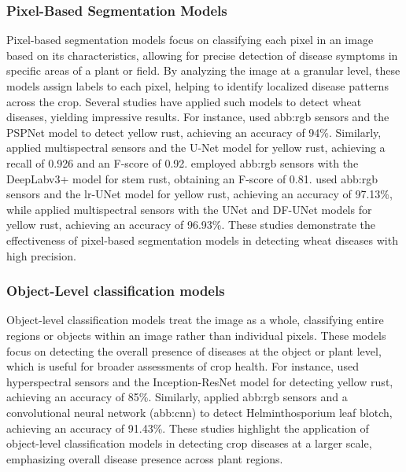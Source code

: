 \subsubsection{Pixel-Based Segmentation Models}

Pixel-based segmentation models focus on classifying each pixel in an image based on its characteristics, allowing for precise detection of disease symptoms in specific areas of a plant or field. By analyzing the image at a granular level, these models assign labels to each pixel, helping to identify localized disease patterns across the crop. Several studies have applied such models to detect wheat diseases, yielding impressive results. For instance, \parencite{pan2021deep} used \gls{abb:rgb} sensors and the PSPNet model to detect yellow rust, achieving an accuracy of 94\%. Similarly, \parencite{su2020aerial} applied multispectral sensors and the U-Net model for yellow rust, achieving a recall of 0.926 and an F-score of 0.92. \parencite{deng2022applying} employed \gls{abb:rgb} sensors with the DeepLabv3+ model for stem rust, obtaining an F-score of 0.81. \parencite{zhang2021irunet} used \gls{abb:rgb} sensors and the lr-UNet model for yellow rust, achieving an accuracy of 97.13\%, while \parencite{zhang2022wheat} applied multispectral sensors with the UNet and DF-UNet models for yellow rust, achieving an accuracy of 96.93\%. These studies demonstrate the effectiveness of pixel-based segmentation models in detecting wheat diseases with high precision.

\subsubsection{Object-Level classification models}

Object-level classification models treat the image as a whole, classifying entire regions or objects within an image rather than individual pixels. These models focus on detecting the overall presence of diseases at the object or plant level, which is useful for broader assessments of crop health. For instance, \parencite{zhang2019deep} used hyperspectral sensors and the Inception-ResNet model for detecting yellow rust, achieving an accuracy of 85\%. Similarly, \parencite{huang2019detection} applied \gls{abb:rgb} sensors and a convolutional neural network (\gls{abb:cnn}) to detect Helminthosporium leaf blotch, achieving an accuracy of 91.43\%. These studies highlight the application of object-level classification models in detecting crop diseases at a larger scale, emphasizing overall disease presence across plant regions.

